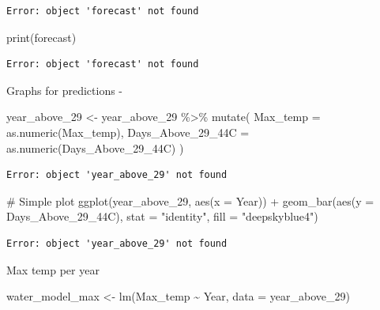 \documentclass[
  letterpaper,
  DIV=11,
  numbers=noendperiod]{scrreprt}
\newenvironment{Shaded}{\begin{snugshade}}{\end{snugshade}}
\newcommand{\AttributeTok}[1]{\textcolor[rgb]{0.40,0.45,0.13}{#1}}
\newcommand{\CommentTok}[1]{\textcolor[rgb]{0.37,0.37,0.37}{#1}}
\newcommand{\FunctionTok}[1]{\textcolor[rgb]{0.28,0.35,0.67}{#1}}
\newcommand{\NormalTok}[1]{\textcolor[rgb]{0.00,0.23,0.31}{#1}}
\newcommand{\OtherTok}[1]{\textcolor[rgb]{0.00,0.23,0.31}{#1}}
\newcommand{\SpecialCharTok}[1]{\textcolor[rgb]{0.37,0.37,0.37}{#1}}
\newcommand{\StringTok}[1]{\textcolor[rgb]{0.13,0.47,0.30}{#1}}
\begin{document}
\begin{verbatim}
Error: object 'forecast' not found
\end{verbatim}

\begin{Shaded}
\begin{Highlighting}[]
\FunctionTok{print}\NormalTok{(forecast)}
\end{Highlighting}
\end{Shaded}

\begin{verbatim}
Error: object 'forecast' not found
\end{verbatim}

Graphs for predictions -

\begin{Shaded}
\begin{Highlighting}[]
\NormalTok{year\_above\_29 }\OtherTok{\textless{}{-}}\NormalTok{ year\_above\_29 }\SpecialCharTok{\%\textgreater{}\%}
  \FunctionTok{mutate}\NormalTok{(}
    \AttributeTok{Max\_temp =} \FunctionTok{as.numeric}\NormalTok{(Max\_temp),}
    \AttributeTok{Days\_Above\_29\_44C =} \FunctionTok{as.numeric}\NormalTok{(Days\_Above\_29\_44C)}
\NormalTok{  )}
\end{Highlighting}
\end{Shaded}

\begin{verbatim}
Error: object 'year_above_29' not found
\end{verbatim}

\begin{Shaded}
\begin{Highlighting}[]
\CommentTok{\# Simple plot}
\FunctionTok{ggplot}\NormalTok{(year\_above\_29, }\FunctionTok{aes}\NormalTok{(}\AttributeTok{x =}\NormalTok{ Year)) }\SpecialCharTok{+}
  \FunctionTok{geom\_bar}\NormalTok{(}\FunctionTok{aes}\NormalTok{(}\AttributeTok{y =}\NormalTok{ Days\_Above\_29\_44C), }\AttributeTok{stat =} \StringTok{"identity"}\NormalTok{, }\AttributeTok{fill =} \StringTok{"deepskyblue4"}\NormalTok{) }
\end{Highlighting}
\end{Shaded}

\begin{verbatim}
Error: object 'year_above_29' not found
\end{verbatim}

Max temp per year

\begin{Shaded}
\begin{Highlighting}[]
\NormalTok{water\_model\_max }\OtherTok{\textless{}{-}} \FunctionTok{lm}\NormalTok{(Max\_temp }\SpecialCharTok{\textasciitilde{}}\NormalTok{ Year, }\AttributeTok{data =}\NormalTok{ year\_above\_29)}
\end{Highlighting}
\end{Shaded}
\end{document}
